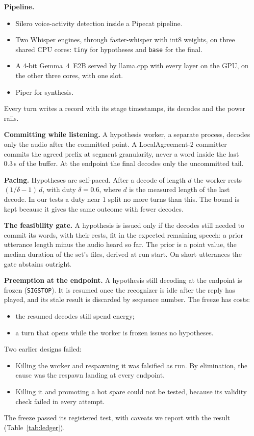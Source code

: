\documentclass[a4paper,10pt,twocolumn]{article}
\begin{document}
\textbf{Pipeline.}
\begin{itemize}
\item Silero voice-activity detection inside a Pipecat pipeline.
\item Two Whisper engines, through faster-whisper with int8 weights, on three
  shared CPU cores: \texttt{tiny} for hypotheses and \texttt{base} for the final.
\item A 4-bit Gemma~4~E2B served by llama.cpp with every layer on the GPU, on
  the other three cores, with one slot.
\item Piper for synthesis.
\end{itemize}
Every turn writes a record with its stage timestamps, its decodes and the power
rails.

\textbf{Committing while listening.} A hypothesis worker, a separate process,
decodes only the audio after the committed point. A LocalAgreement-2 committer
\cite{machacek2023whisperstreaming} commits the agreed prefix at segment
granularity, never a word inside the last 0.3\,s of the buffer. At the
endpoint the final decodes only the uncommitted tail.

\textbf{Pacing.} Hypotheses are self-paced. After a decode of length $d$ the
worker rests $(1/\delta - 1)\,d$, with duty $\delta = 0.6$, where $d$ is the
measured length of the last decode. In our tests a duty near 1 split no more
turns than this. The bound is kept because it gives the same outcome with
fewer decodes.

\textbf{The feasibility gate.} A hypothesis is issued only if the decodes
still needed to commit its words, with their rests, fit in the expected
remaining speech: a prior utterance length minus the audio heard so far. The
prior is a point value, the median duration of the set's files, derived at
run start. On short utterances the gate abstains outright.

\textbf{Preemption at the endpoint.} A hypothesis still decoding at the
endpoint is frozen (\texttt{SIGSTOP}). It is resumed once the recognizer is
idle after the reply has played, and its stale result is discarded by sequence
number. The freeze has costs:
\begin{itemize}
\item the resumed decodes still spend energy;
\item a turn that opens while the worker is frozen issues no hypotheses.
\end{itemize}
Two earlier designs failed:
\begin{itemize}
\item Killing the worker and respawning it was falsified as run. By
  elimination, the cause was the respawn landing at every endpoint.
\item Killing it and promoting a hot spare could not be tested, because its
  validity check failed in every attempt.
\end{itemize}
The freeze passed its registered test, with caveats we report with the result
(Table~\ref{tab:ledger}).
\end{document}

